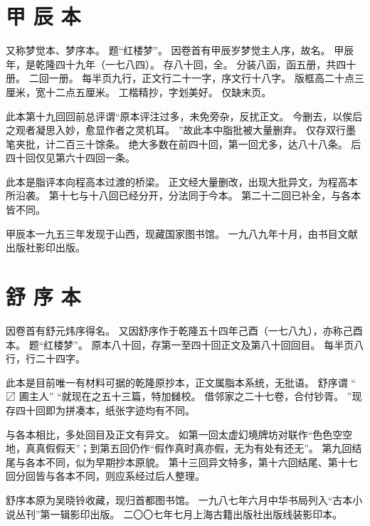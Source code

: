 \section*{甲 辰 本}
又称梦觉本、梦序本。
题“红楼梦”。
因卷首有甲辰岁梦觉主人序，故名。
甲辰年，是乾隆四十九年（一七八四）。
存八十回，全。
分装八函，函五册，共四十册。
二回一册。
每半页九行，正文行二十一字，序文行十八字。
版框高二十点三厘米，宽十二点五厘米。
工楷精抄，字划美好。
仅缺末页。
\par
此本第十九回回前总评谓“原本评注过多，未免旁杂，反扰正文。
今删去，以俟后之观者凝思入妙，愈显作者之灵机耳。
”故此本中脂批被大量删弃。
仅存双行墨笔夹批，计二百三十馀条。
绝大多数在前四十回，第一回尤多，达八十八条。
后四十回仅见第六十四回一条。
\par
此本是脂评本向程高本过渡的桥梁。
正文经大量删改，出现大批异文，为程高本所沿袭。
第十七与十八回已经分开，分法同于今本。
第二十二回已补全，与各本皆不同。
\par
甲辰本一九五三年发现于山西，现藏国家图书馆。
一九八九年十月，由书目文献出版社影印出版。
\par
\section*{舒 序 本}
因卷首有舒元炜序得名。
又因舒序作于乾隆五十四年己酉（一七八九），亦称己酉本。
题“红楼梦”。
原本八十回，存第一至四十回正文及第八十回回目。
每半页八行，行二十四字。
\par
此本是目前唯一有材料可据的乾隆原抄本，正文属脂本系统，无批语。
舒序谓 “ 〼 圃主人” “就现在之五十三篇，特加雠校。
借邻家之二十七卷，合付钞胥。
”现存四十回即为拼凑本，纸张字迹均有不同。
\par
与各本相比，多处回目及正文有异文。
如第一回太虚幻境牌坊对联作“色色空空地，真真假假天”；到第五回仍作“假作真时真亦假，无为有处有还无”。
第九回结尾与各本不同，似为早期抄本原貌。
第十三回异文特多，第十六回结尾、第十七回分回皆与各本不同，则应系经过后人整理。
\par
舒序本原为吴晓铃收藏，现归首都图书馆。
一九八七年六月中华书局列入“古本小说丛刊”第一辑影印出版。
二〇〇七年七月上海古籍出版社出版线装影印本。
\par
